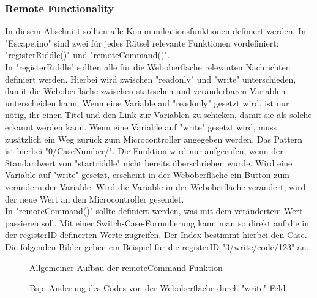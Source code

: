 \documentclass[12pt]{article} %
\begin{document}
\subsubsection{Remote Functionality}
In diesem Abschnitt sollten alle Kommunikationsfunktionen definiert werden. In "Escape.ino" sind zwei für jedes Rätsel relevante Funktionen vordefiniert: "registerRiddle()" und "remoteCommand()". \\
In "registerRiddle" sollten alle für die Weboberfläche relevanten Nachrichten definiert werden. Hierbei wird zwischen "readonly" und "write" unterschieden, damit die Weboberfläche zwischen statischen und veränderbaren Variablen unterscheiden kann. 
Wenn eine Variable auf "readonly" gesetzt wird, ist nur nötig, ihr einen Titel und den Link zur Variablen zu schicken, damit sie als solche erkannt werden kann. Wenn eine Variable auf "write" gesetzt wird, muss zusätzlich ein Weg zurück zum Microcontroller angegeben werden. Das Pattern ist hierbei "0/CaseNumber/". Die Funktion wird nur aufgerufen, wenn der Standardwert von "startriddle" nicht bereits überschrieben wurde.
Wird eine Variable auf "write" gesetzt, erscheint in der Weboberfläche ein Button zum verändern der Variable. Wird die Variable in der Weboberfläche verändert, wird der neue Wert an den Microcontroller gesendet. \\
In "remoteCommand()" sollte definiert werden, was mit dem verändertem Wert passieren soll. 
Mit einer Switch-Case-Formulierung kann man so direkt auf die in der registerID definerten Werte zugreifen. 
Der Index bestimmt hierbei den Case. Die folgenden Bilder geben ein Beispiel für die registerID "3/write/code/123" an.
\begin{figure}[H] 
  \caption{Allgemeiner Aufbau der remoteCommand Funktion}
  \label{fig:remoteCommand}
\end{figure}

\begin{figure}[H]
  \caption{Bsp: Änderung des Codes von der Weboberfläche durch "write" Feld}
  \label{fig:sendCode}
\end{figure}
\end{document}
